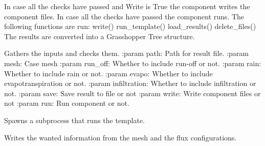 \documentclass[letterpaper,10pt,english]{sphinxmanual}
\begin{document}
\begin{fulllineitems}

\begin{fulllineitems}
\label{\detokenize{cmf:livestock.components.comp_cmf.CMFSurfaceFluxResult.run}}
In case all the checks have passed and Write is True the component writes the component files.
In case all the checks have passed the component runs.
The following functions are run:
write()
run\_template()
load\_results()
delete\_files()
The results are converted into a Grasshopper Tree structure.

\end{fulllineitems}


\begin{fulllineitems}
\label{\detokenize{cmf:livestock.components.comp_cmf.CMFSurfaceFluxResult.run_checks}}
Gathers the inputs and checks them.
:param path: Path for result file.
:param mesh: Case mesh
:param run\_off: Whether to include run-off or not.
:param rain: Whether to include rain or not.
:param evapo: Whether to include evapotranspiration or not.
:param infiltration: Whether to include infiltration or not.
:param save: Save result to file or not
:param write: Write component files or not
:param run: Run component or not.

\end{fulllineitems}


\begin{fulllineitems}
\label{\detokenize{cmf:livestock.components.comp_cmf.CMFSurfaceFluxResult.run_template}}
Spawns a subprocess that runs the template.

\end{fulllineitems}


\begin{fulllineitems}
\label{\detokenize{cmf:livestock.components.comp_cmf.CMFSurfaceFluxResult.write}}
Writes the wanted information from the mesh and the flux configurations.

\end{fulllineitems}


\end{fulllineitems}
\end{document}
